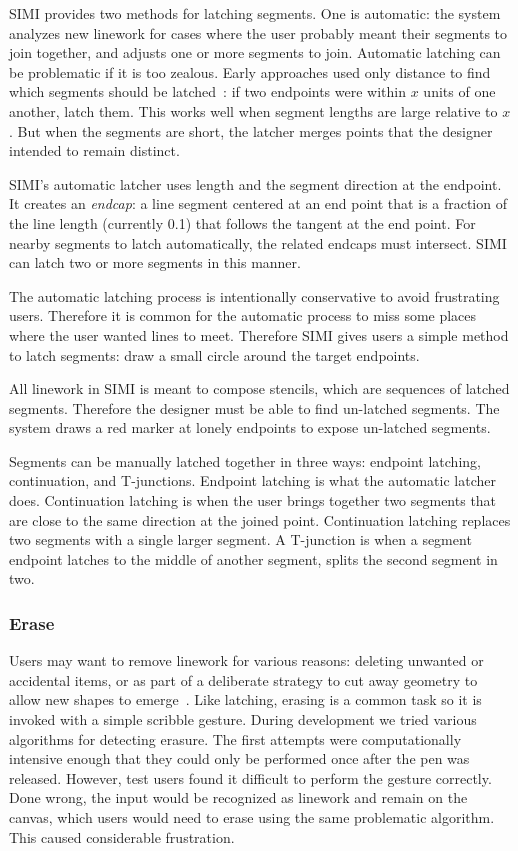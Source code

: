 \documentclass{article}
\begin{document}
SIMI provides two methods for latching segments. One is automatic: the
system analyzes new linework for cases where the user probably meant
their segments to join together, and adjusts one or more segments to
join. Automatic latching can be problematic if it is too
zealous. Early approaches used only distance to find which segments
should be latched~\cite{herot-latch-corners}: if two endpoints were
within $x$ units of one another, latch them. This works well when
segment lengths are large relative to $x$. But when the segments are
short, the latcher merges points that the designer intended to remain
distinct.

SIMI's automatic latcher uses length and the segment direction at the
endpoint. It creates an \textit{endcap}: a line segment centered at an
end point that is a fraction of the line length (currently 0.1) that
follows the tangent at the end point. For nearby segments to latch
automatically, the related endcaps must intersect. SIMI can latch two
or more segments in this manner.

The automatic latching process is intentionally conservative to avoid
frustrating users. Therefore it is common for the automatic process to
miss some places where the user wanted lines to meet. Therefore SIMI
gives users a simple method to latch segments: draw a small circle
around the target endpoints.

All linework in SIMI is meant to compose stencils, which are sequences
of latched segments. Therefore the designer must be able to find
un-latched segments. The system draws a red marker at lonely endpoints
to expose un-latched segments.

Segments can be manually latched together in three ways: endpoint
latching, continuation, and T-junctions. Endpoint latching is what the
automatic latcher does. Continuation latching is when the user brings
together two segments that are close to the same direction at the
joined point. Continuation latching replaces two segments with a
single larger segment. A T-junction is when a segment endpoint latches
to the middle of another segment, splits the second segment in two.

\subsubsection{Erase}

Users may want to remove linework for various reasons: deleting
unwanted or accidental items, or as part of a deliberate strategy to
cut away geometry to allow new shapes to
emerge~\cite{zeleznik-lineogrammer}. Like latching, erasing is a
common task so it is invoked with a simple scribble gesture. During
development we tried various algorithms for detecting erasure. The
first attempts were computationally intensive enough that they could
only be performed once after the pen was released. However, test users
found it difficult to perform the gesture correctly. Done wrong, the
input would be recognized as linework and remain on the canvas, which
users would need to erase using the same problematic algorithm. This
caused considerable frustration.
\end{document}
